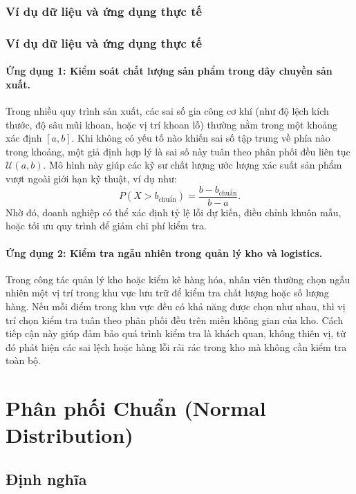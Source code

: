 \subsubsection{Ví dụ dữ liệu và ứng dụng thực tế}

\subsubsection{Ví dụ dữ liệu và ứng dụng thực tế}

\paragraph{Ứng dụng 1: Kiểm soát chất lượng sản phẩm trong dây chuyền sản xuất.} 
Trong nhiều quy trình sản xuất, các sai số gia công cơ khí (như độ lệch kích thước, độ sâu mũi khoan, hoặc vị trí khoan lỗ) thường nằm trong một khoảng xác định \([a, b]\). Khi không có yếu tố nào khiến sai số tập trung về phía nào trong khoảng, một giả định hợp lý là sai số này tuân theo phân phối đều liên tục \(\mathcal{U}(a, b)\). 
Mô hình này giúp các kỹ sư chất lượng ước lượng xác suất sản phẩm vượt ngoài giới hạn kỹ thuật, ví dụ như:
\[
P(X > b_{\text{chuẩn}}) = \frac{b - b_{\text{chuẩn}}}{b - a}.
\]
Nhờ đó, doanh nghiệp có thể xác định tỷ lệ lỗi dự kiến, điều chỉnh khuôn mẫu, hoặc tối ưu quy trình để giảm chi phí kiểm tra.

\paragraph{Ứng dụng 2: Kiểm tra ngẫu nhiên trong quản lý kho và logistics.} 
Trong công tác quản lý kho hoặc kiểm kê hàng hóa, nhân viên thường chọn ngẫu nhiên một vị trí trong khu vực lưu trữ để kiểm tra chất lượng hoặc số lượng hàng. Nếu mỗi điểm trong khu vực đều có khả năng được chọn như nhau, thì vị trí chọn kiểm tra tuân theo phân phối đều trên miền không gian của kho. 
Cách tiếp cận này giúp đảm bảo quá trình kiểm tra là khách quan, không thiên vị, từ đó phát hiện các sai lệch hoặc hàng lỗi rải rác trong kho mà không cần kiểm tra toàn bộ.

\section{Phân phối Chuẩn (Normal Distribution)}

\subsection{Định nghĩa}

